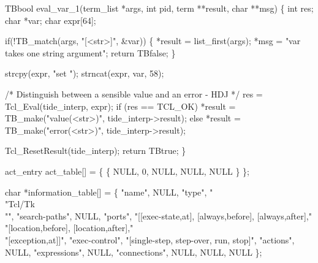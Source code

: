 \nwenddocs{}\endmoddef\let\nwnotused=\nwoutput{}
TBbool eval_var_1(term_list *args, int pid, term **result, char **msg)
\{
  int  res;
  char *var;
  char expr[64];

  if(!TB_match(args, "[<str>]", &var)) \{
    *result = list_first(args);
    *msg = "var takes one string argument";
    return TBfalse;
  \}

  strcpy(expr, "set ");
  strncat(expr, var, 58);

  /* Distinguish between a sensible value and an error - HDJ */
  res = Tcl_Eval(tide_interp, expr);
  if (res == TCL_OK)
    *result = TB_make("value(<str>)", tide_interp->result);
  else
        *result = TB_make("error(<str>)", tide_interp->result);

  Tcl_ResetResult(tide_interp);
  return TBtrue;
\}
\nwendcode{}\nwdocspar


\nwenddocs{}\endmoddef
act_entry act_table[] =
\{ \{ NULL, 0, NULL, NULL, NULL \}
\};
\nwendcode{}\nwdocspar


\nwenddocs{}\endmoddef
char *information_table[] =
\{ "name",               NULL,
  "type",               "\\"Tcl/Tk\\"",
  "search-paths",       NULL,
  "ports",              "[[exec-state,at], [always,before], [always,after]," \\
                        "[location,before], [location,after]," \\
                        "[exception,at]]",
  "exec-control",       "[single-step, step-over, run, stop]",
  "actions",            NULL,
  "expressions",        NULL,
  "connections",        NULL,
  NULL,                 NULL
\};
\nwendcode{}\nwdocspar

